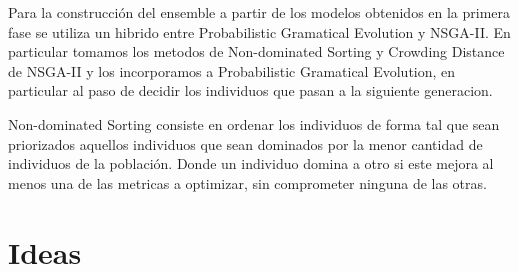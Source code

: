 Para la construcción del ensemble a partir de los modelos obtenidos en la primera fase se utiliza un
hibrido entre Probabilistic Gramatical Evolution y NSGA-II. En particular tomamos los metodos de
Non-dominated Sorting y Crowding Distance de NSGA-II y los incorporamos a Probabilistic Gramatical
Evolution, en particular al paso de decidir los individuos que pasan a la siguiente generacion.

Non-dominated Sorting consiste en ordenar los individuos de forma tal que sean priorizados aquellos
individuos que sean dominados por la menor cantidad de individuos de la población. Donde un individuo
domina a otro si este mejora al menos una de las metricas a optimizar, sin comprometer ninguna de las
otras.

\section{Ideas}
